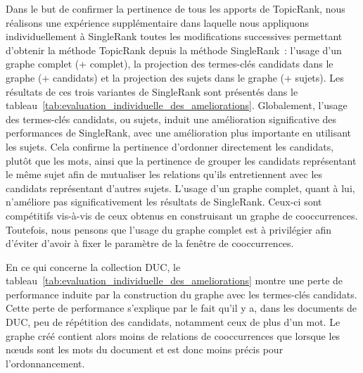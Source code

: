     Dans le but de confirmer la pertinence de tous les apports de TopicRank,
    nous réalisons une expérience supplémentaire dans laquelle nous appliquons
    individuellement à SingleRank toutes les modifications successives
    permettant d'obtenir la méthode TopicRank depuis la méthode SingleRank~:
    l'usage d'un graphe complet (+ complet), la projection des termes-clés
    candidats dans le graphe (+ candidats) et la projection des sujets dans le
    graphe (+ sujets). Les résultats de ces trois variantes de SingleRank sont
    présentés dans le
    tableau~\ref{tab:evaluation_individuelle_des_ameliorations}. Globalement,
    l'usage des termes-clés candidats, ou sujets, induit une amélioration
    significative des performances de SingleRank, avec une amélioration plus
    importante en utilisant les sujets. Cela confirme la pertinence d'ordonner
    directement les candidats, plutôt que les mots, ainsi que la pertinence de
    grouper les candidats représentant le même sujet afin de mutualiser les
    relations qu'ils entretiennent avec les candidats représentant d'autres
    sujets. L'usage d'un graphe complet, quant à lui, n'améliore pas
    significativement les résultats de SingleRank. Ceux-ci sont compétitifs
    vis-à-vis de ceux obtenus en construisant un graphe de cooccurrences.
    Toutefois, nous pensons que l'usage du graphe complet est à privilégier afin
    d'éviter d'avoir à fixer le paramètre de la fenêtre de cooccurrences.
    
    En ce qui concerne la collection DUC, le
    tableau~\ref{tab:evaluation_individuelle_des_ameliorations} montre une perte
    de performance induite par la construction du graphe avec les termes-clés
    candidats. Cette perte de performance s'explique par le fait qu'il y a, dans
    les documents de DUC, peu de répétition des candidats, notamment ceux de
    plus d'un mot. Le graphe créé contient alors moins de relations de
    cooccurrences que lorsque les n\oe{}uds sont les mots du document et est
    donc moins précis pour l'ordonnancement.

